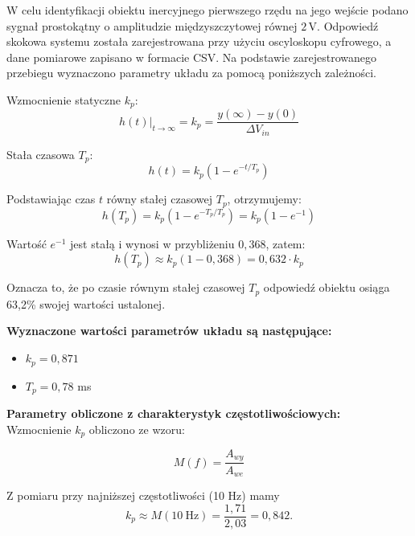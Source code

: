 \documentclass[12pt,a4paper]{article}
\begin{document}
	W celu identyfikacji obiektu inercyjnego pierwszego rzędu na jego wejście podano sygnał prostokątny o amplitudzie międzyszczytowej równej \(2\,\text{V}\). Odpowiedź skokowa systemu została zarejestrowana przy użyciu oscyloskopu cyfrowego, a dane pomiarowe zapisano w formacie CSV. Na podstawie zarejestrowanego przebiegu wyznaczono parametry układu za pomocą poniższych zależności.
	
	Wzmocnienie statyczne \(k_p\):
	\begin{equation}
		h(t)\big|_{t \to \infty} = k_p = \frac{y(\infty) - y(0)}{\Delta V_{in}}
	\end{equation}
	
	Stała czasowa \(T_p\):
	\begin{equation}
		h(t) = k_p(1-e^{-t/T_p})
	\end{equation}
	
	Podstawiając czas $t$ równy stałej czasowej $T_p$, otrzymujemy:
	\begin{equation}
		h(T_p) = k_p(1-e^{-T_p/T_p}) = k_p(1-e^{-1})
	\end{equation}
	
	Wartość $e^{-1}$ jest stałą i wynosi w przybliżeniu $0{,}368$, zatem:
	\begin{equation}
		h(T_p) \approx k_p(1-0{,}368) = 0{,}632 \cdot k_p
	\end{equation}
	
	Oznacza to, że po czasie równym stałej czasowej $T_p$ odpowiedź obiektu osiąga 63,2\% swojej wartości ustalonej.
	
	\textbf{Wyznaczone wartości parametrów układu są następujące:}
	\begin{itemize}
		\item $k_p = 0{,}871$
		\item $T_p = 0{,}78$ ms
	\end{itemize}
	
	\textbf{Parametry obliczone z charakterystyk częstotliwościowych:} \\
	\indent Wzmocnienie $k_p$ obliczono ze wzoru:
	
	\begin{equation}
		M(f)=\frac{A_{wy}}{A_{we}}
	\end{equation}
	
	Z pomiaru przy najniższej częstotliwości (10 Hz) mamy
	\begin{equation}
		k_p \approx M(10\ \text{Hz}) = \frac{1{,}71}{2{,}03} = 0{,}842.
	\end{equation}
	
\end{document}
